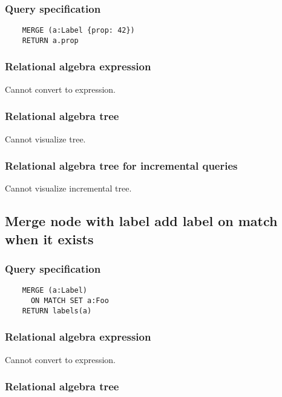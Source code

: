 	\subsubsection*{Query specification}

	\begin{lstlisting}
	MERGE (a:Label {prop: 42})
	RETURN a.prop
	\end{lstlisting}


	\subsubsection*{Relational algebra expression}

	Cannot convert to expression.

	\subsubsection*{Relational algebra tree}

	Cannot visualize tree.

	\subsubsection*{Relational algebra tree for incremental queries}

	Cannot visualize incremental tree.
	\subsection{Merge node with label add label on match when it exists}

	\subsubsection*{Query specification}

	\begin{lstlisting}
	MERGE (a:Label)
	  ON MATCH SET a:Foo
	RETURN labels(a)
	\end{lstlisting}


	\subsubsection*{Relational algebra expression}

	Cannot convert to expression.

	\subsubsection*{Relational algebra tree}

